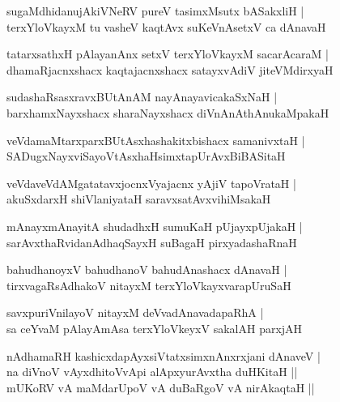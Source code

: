 \begin{shloka}
sugaMdhidanujAkiVNeRV pureV tasimxMsutx bASakxliH |\\
terxYloVkayxM tu vasheV kaqtAvx suKeVnAsetxV ca dAnavaH 
\end{shloka}

\begin{shloka}
tatarxsathxH pAlayanAnx setxV terxYloVkayxM sacarAcaraM |\\
dhamaRjacnxshacx kaqtajacnxshacx satayxvAdiV jiteVMdirxyaH
\end{shloka}

\begin{shloka}
sudashaRsasxravxBUtAnAM nayAnayavicakaSxNaH |\\
barxhamxNayxshacx sharaNayxshacx diVnAnAthAnukaMpakaH
\end{shloka}

\begin{shloka}
veVdamaMtarxparxBUtAsxhashakitxbishacx samanivxtaH |\\
SADugxNayxviSayoVtAsxhaHsimxtapUrAvxBiBASitaH
\end{shloka}

\begin{shloka}
veVdaveVdAMgatatavxjocnxVyajacnx yAjiV tapoVrataH |\\
akuSxdarxH shiVlaniyataH saravxsatAvxvihiMsakaH
\end{shloka}

\begin{shloka}
mAnayxmAnayitA shudadhxH sumuKaH pUjayxpUjakaH |\\
sarAvxthaRvidanAdhaqSayxH suBagaH pirxyadashaRnaH
\end{shloka}

\begin{shloka}
bahudhanoyxV bahudhanoV bahudAnashacx dAnavaH |\\
tirxvagaRsAdhakoV nitayxM terxYloVkayxvarapUruSaH
\end{shloka}

\begin{shloka}
savxpuriVnilayoV nitayxM deVvadAnavadapaRhA |\\
sa ceYvaM pAlayAmAsa terxYloVkeyxV sakalAH parxjAH
\end{shloka}

\begin{shloka}
nAdhamaRH kashicxdapAyxsiVtatxsimxnAnxrxjani dAnaveV |\\
na diVnoV vAyxdhitoVvApi alApxyurAvxtha duHKitaH ||\\
mUKoRV vA maMdarUpoV vA duBaRgoV vA nirAkaqtaH ||
\end{shloka}

